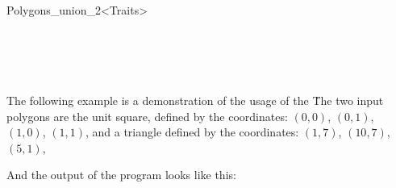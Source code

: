 \begin{ccRefFunctionObjectClass}{Polygons_union_2<Traits>}
\ccSeeAlso

 \\
 \\
 \\
 \\



\ccExample
\label{sec:example1_polygon_bops}
The following example is a demonstration of the usage of the 
\ccClassTemplateName\. 
The two input polygons are the unit square,
defined by the coordinates: 
$(0,0)$, $(0,1)$, $(1,0)$, $(1,1)$, 
and a triangle defined by the coordinates:
$(1,7)$, $(10,7)$, $(5,1)$,


And the output of the program looks like this:


\end{ccRefFunctionObjectClass}

\ccRefPageEnd








